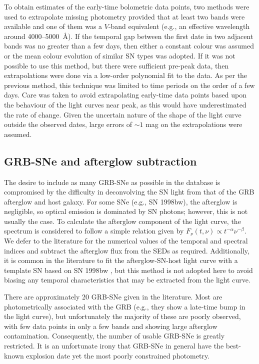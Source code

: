 \documentclass[a4paper,fleqn,usenatbib]{mnras}
\begin{document}
To obtain estimates of the early-time bolometric data points, two methods were used to extrapolate missing photometry provided that at least two bands were available and one of them was a $V$-band equivalent (e.g., an effective wavelength around 4000--5000~\AA). If the temporal gap between the first date in two adjacent bands was no greater than a few days, then either a constant colour was assumed or the mean colour evolution of similar SN types was adopted. If it was not possible to use this method, but there were sufficient pre-peak data, then extrapolations were done via a low-order polynomial fit to the data. As per the previous method, this technique was limited to time periods on the order of a few days. Care was taken to avoid extrapolating early-time data points based upon the behaviour of the light curves near peak, as this would have underestimated the rate of change. Given the uncertain nature of the shape of the light curve outside the observed dates, large errors of $\sim 1$ mag on the extrapolations were assumed.

\subsection{GRB-SNe and afterglow subtraction}
The desire to include as many GRB-SNe as possible in the database is compromised by the difficulty in deconvolving the SN light from that of the GRB afterglow and host galaxy. For some SNe (e.g., SN 1998bw), the afterglow is negligible, so optical emission is dominated by SN photons; however, this is not usually the case. To calculate the afterglow component of the light curve, the spectrum is considered to follow a simple relation given by $F_{\nu}(t,\nu)\propto t^{-\alpha}\nu^{-\beta}$. We defer to the literature for the numerical values of the temporal and spectral indices and subtract the afterglow flux from the SEDs as required. Additionally, it is common in the literature to fit the afterglow-SN-host light curve with a template SN based on SN 1998bw \citep{Cano2013}, but this method is not adopted here to avoid biasing any temporal characteristics that may be extracted from the light curve. 

There are approximately 20 GRB-SNe given in the literature. Most are photometrically associated with the GRB (e.g., they show a late-time bump in the light curve), but unfortunately the majority of these are poorly observed, with few data points in only a few bands and showing large afterglow contamination. Consequently, the number of usable GRB-SNe is greatly restricted.  It is an unfortunate irony that GRB-SNe in general have the best-known explosion date yet the most poorly constrained photometry. 
\end{document}

